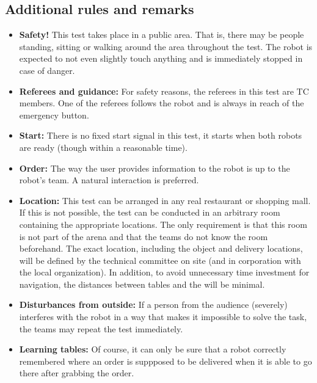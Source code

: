 \subsection{Additional rules and remarks}

\begin{itemize}
	\item \textbf{Safety!} This test takes place in a public area. That is, there may be people standing, sitting or walking around the area throughout the test. The robot is expected to not even slightly touch anything and is immediately stopped in case of danger.

	\item \textbf{Referees and guidance:} For safety reasons, the referees in this test are TC members. One of the referees follows the robot and is always in reach of the emergency button.

	\item \textbf{Start:} There is no fixed start signal in this test, it starts when both robots are ready (though within a reasonable time).

	\item \textbf{Order:} The way the user provides information to the robot is up to the robot's team. A natural interaction is preferred.

	\item \textbf{Location:} This test can be arranged in any real restaurant or shopping mall. If this is not possible, the test can be conducted in an arbitrary room containing the appropriate locations. 
	  The only requirement is that this room is not part of the arena and that the teams do not know the room beforehand. 
	  The exact location, including the object and delivery locations, will be defined by the technical committee on site (and in corporation with the local organization). 
	  In addition, to avoid unnecessary time investment for navigation, the distances between tables and the  will be minimal.

	\item \textbf{Disturbances from outside:} If a person from the audience (severely) interferes with the robot in a way that makes it impossible to solve the task, the teams may repeat the test immediately.

	\item \textbf{Learning tables:} Of course, it can only be sure that a robot correctly remembered where an order is suppposed to be delivered when it is able to go there after grabbing the order. 
	

\end{itemize}

